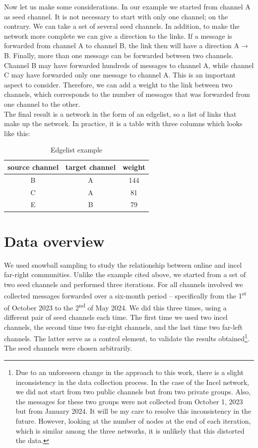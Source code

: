 \documentclass[a4paper,twoside,12pt, openany]{book}
\begin{document}
Now let us make some considerations. In our example we started from channel A as seed channel. It is not necessary to start with only one channel; on the contrary. We can take a set of several seed channels. In addition, to make the network more complete we can give a direction to the links. If a message is forwarded from channel A to channel B, the link then will have a direction A$\rightarrow$B. Finally, more than one message can be forwarded between two channels. Channel B may have forwarded hundreds of messages to channel A, while channel C may have forwarded only one message to channel A. This is an important aspect to consider. Therefore, we can add a weight to the link between two channels, which corresponds to the number of messages that was forwarded from one channel to the other.\\

The final result is a network in the form of an edgelist, so a list of links that make up the network. In practice, it is a table with three columns which looks like this:

\renewcommand{\arraystretch}{1.2}

\begin{table}[ht]
\centering
\begin{tabular}{| c | c | c |}
	\hline
	\textbf{source channel} & \textbf{target channel} & \textbf{weight} \\
	\hline
	B & A & 144 \\
	C & A & 81 \\
	E & B & 79 \\
	\hline
\end{tabular}
\caption{Edgelist example}
\label{tab:sample}
\end{table}

\section{Data overview}
We used snowball sampling to study the relationship between online and incel far-right communities. Unlike the example cited above, we started from a set of two seed channels and performed three iterations. For all channels involved we collected messages forwarded over a six-month period – specifically from the 1\textsuperscript{st} of October 2023 to the 2\textsuperscript{nd} of May 2024. We did this three times, using a different pair of seed channels each time. The first time we used two incel channels, the second time two far-right channels, and the last time two far-left channels. The latter serve as a control element, to validate the results obtained\footnote{Due to an unforeseen change in the approach to this work, there is a slight inconsistency in the data collection process. In the case of the Incel network, we did not start from two public channels but from two private groups. Also, the messages for these two groups were not collected from October 1, 2023 but from January 2024. It will be my care to resolve this inconsistency in the future. However, looking at the number of nodes at the end of each iteration, which is similar among the three networks, it is unlikely that this distorted the data.}. The seed channels were chosen arbitrarily. \\
\end{document}
